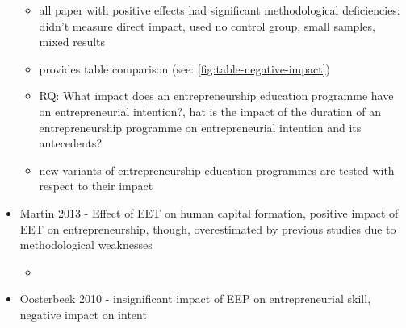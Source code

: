 \begin{itemize}
\begin{itemize}
\item all paper with positive effects had significant methodological deficiencies: didn't measure direct impact, used no control group, small samples, mixed results
\item provides table comparison (see: \ref{fig:table-negative-impact})
\item RQ: What impact does an entrepreneurship education programme have on entrepreneurial intention?, hat is the impact of the duration of an entrepreneurship programme on entrepreneurial intention and its antecedents?
\item new variants of entrepreneurship education programmes are tested with respect to their impact
\end{itemize}

\item Martin 2013 - Effect of EET on human capital formation, positive impact of EET on entrepreneurship, though, overestimated by previous studies due to methodological weaknesses
\begin{itemize}
\item 
\end{itemize}

\item Oosterbeek 2010 - insignificant impact of EEP on entrepreneurial skill, negative impact on intent


\end{itemize}
